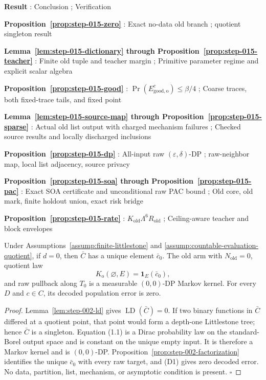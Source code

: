 \noindent\textbf{ Result }:  Conclusion ;  Verification \par
\noindent\textbf{ Proposition~\ref{prop:step-015-zero} }:  Exact no-data old branch ;   quotient singleton result \par
\noindent\textbf{ Lemma~\ref{lem:step-015-dictionary} through Proposition~\ref{prop:step-015-teacher} }:  Finite old tuple and teacher margin ;  Primitive parameter regime and explicit scalar algebra \par
\noindent\textbf{ Proposition~\ref{prop:step-015-good} }:  \(\Pr(E_{\mathrm{good,o}}^c)\le\beta/4\) ;  Coarse traces, both fixed-trace tails, and fixed point \par
\noindent\textbf{ Lemma~\ref{lem:step-015-source-map} through Proposition~\ref{prop:step-015-sparse} }:  Actual old list output with charged mechanism failures ;  Checked source results and locally discharged inclusions \par
\noindent\textbf{ Proposition~\ref{prop:step-015-dp} }:  All-input raw \((\varepsilon,\delta)\)-DP ;   raw-neighbor map, local list adjacency, source privacy \par
\noindent\textbf{ Proposition~\ref{prop:step-015-soa} through Proposition~\ref{prop:step-015-pac} }:  Exact SOA certificate and unconditional raw PAC bound ;  Old core, old mark, finite holdout union, exact risk bridge \par
\noindent\textbf{ Proposition~\ref{prop:step-015-rate} }:  \(K_{\mathrm{old}}\Lambda^6R_{\mathrm{old}}\) ;  Ceiling-aware teacher and block envelopes \par



\begin{proposition}\label{prop:step-015-zero}
Under Assumptions~\ref{assump:finite-littlestone} and
\ref{assump:countable-evaluation-quotient}, if \(d=0\), then \(\bar C\)
has a unique element \(\bar c_0\). The old arm with
\(N_{\mathrm{old}}=0\), quotient law
\[
K_{\mathrm o}(\varnothing,E)=\mathbf1_E(\bar c_0),
\tag{1.1}
\]
and raw pullback along \(T_0\) is a measurable \((0,0)\)-DP Markov kernel.
For every \(D\) and \(c\in C\), its decoded population error is zero.


\end{proposition}

\begin{proof}
Lemma~\ref{lem:step-002-ld} gives
\(\operatorname{LD}(\bar C)=0\). If two binary functions in \(\bar C\)
differed at a quotient point, that point would form a depth-one
Littlestone tree; hence \(\bar C\) is a singleton. Equation (1.1) is a
Dirac probability law on the standard-Borel output space and is constant
on the unique empty input. It is therefore a Markov kernel and is
\((0,0)\)-DP. Proposition~\ref{prop:step-002-factorization}
identifies the unique \(\bar c_0\) with every raw target, and (D1) gives
zero decoded error. No data, partition, list, mechanism, or asymptotic
condition is present. \(\square\)


\end{proof}

